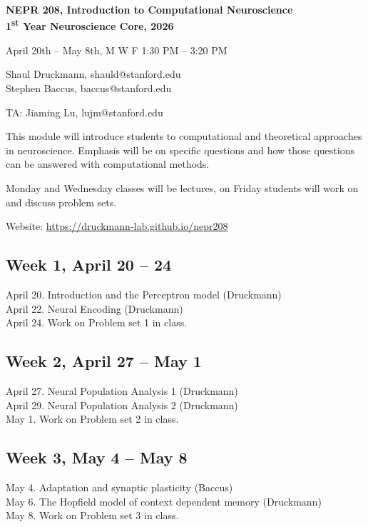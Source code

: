 \documentclass[11pt]{article}
\begin{document}
{\Large \textbf{NEPR 208, Introduction to Computational Neuroscience}} \\
{\Large \textbf{1\textsuperscript{st} Year Neuroscience Core, 2026}}

April 20th -- May 8th, M W F 1:30 PM -- 3:20 PM

Shaul Druckmann, shauld@stanford.edu \\
Stephen Baccus, baccus@stanford.edu

TA: Jiaming Lu, lujm@stanford.edu

This module will introduce students to computational and theoretical approaches in neuroscience. Emphasis will be on specific questions and how those questions can be answered with computational methods.

Monday and Wednesday classes will be lectures, on Friday students will work on and discuss problem sets.

Website: \url{https://druckmann-lab.github.io/nepr208}

\subsection*{Week 1, April 20 -- 24}

April 20. Introduction and the Perceptron model (Druckmann) \\
April 22. Neural Encoding (Druckmann) \\
April 24. Work on Problem set 1 in class.

\subsection*{Week 2, April 27 -- May 1}

April 27. Neural Population Analysis 1 (Druckmann) \\
April 29. Neural Population Analysis 2 (Druckmann) \\
May 1. Work on Problem set 2 in class.

\subsection*{Week 3, May 4 -- May 8}

May 4. Adaptation and synaptic plasticity (Baccus) \\
May 6. The Hopfield model of context dependent memory (Druckmann) \\
May 8. Work on Problem set 3 in class.
\end{document}
